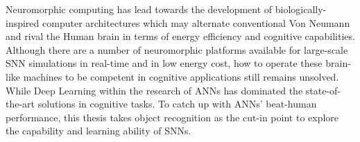 Neuromorphic computing has lead towards the development of biologically-inspired computer architectures which may alternate conventional Von Neumann and rival the Human brain in terms of energy efficiency and cognitive capabilities.
Although there are a number of neuromorphic platforms available for large-scale SNN simulations in real-time and in low energy cost, how to operate these brain-like machines to be competent in cognitive applications still remains unsolved.
While Deep Learning within the research of ANNs has dominated the state-of-the-art solutions in cognitive tasks.
To catch up with ANNs' beat-human performance, this thesis takes object recognition as the cut-in point to explore the capability and learning ability of SNNs.

